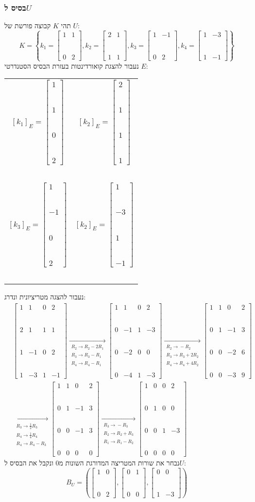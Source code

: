 \documentclass[11pt, oneside]{article}
\newcommand{\qed}{\R{$\blacksquare$}}
\newcommand{\br}{\\\\\\\\\\\\}
\newcommand{\opr}[1]{\xrightarrow[\text{#1}]{}}
\newcommand{\oprm}[1]{\underset{\substack{#1}}{\longrightarrow}}
\newcommand{\tot}[4]{\begin{bmatrix}#1 & #2\br#3 & #4\end{bmatrix}}
\newcommand{\fcol}[4]{\begin{bmatrix}#1 \br #2\br#3 \br #4\end{bmatrix}}
\begin{document}
\subsubsection{בסיס ל$U$}
תהי $K$ קבוצה פורשת של $U$:
$$K = \left\{
k_1 = \tot{1}{1}{0}{2},
k_2 = \tot{2}{1}{1}{1},
k_3 = \tot{1}{-1}{0}{2},
k_4 = \tot{1}{-3}{1}{-1}
\right\}$$
נעבור להצגת קואורדינטות בעזרת הבסיס הסטנדרטי $E$:
\begin{center}
\begin{tabular}{c c}
$[k_1]_E = \fcol{1}{1}{0}{2}$ & $[k_2]_E = \fcol{2}{1}{1}{1}$\br
$[k_3]_E = \fcol{1}{-1}{0}{2}$ & $[k_2]_E = \fcol{1}{-3}{1}{-1}$\br
\end{tabular}
\end{center}
נעבור להצגה מטריציונית ונדרג:
\begin{align*}
& \begin{bmatrix}
1 & 1 & 0 & 2\br
2 & 1 & 1 & 1\br
1 & -1 & 0 & 2\br
1 & -3 & 1 & -1
\end{bmatrix}
\oprm{%
R_2 \opr{} R_2 - 2R_1\\
R_3 \opr{} R_3 - R_1\\
R_4 \opr{} R_4 - R_1
}
\begin{bmatrix}
1 & 1 & 0 & 2\br
0 & -1 & 1 & -3\br
0 & -2 & 0 & 0\br
0 & -4 & 1 & -3
\end{bmatrix}
\oprm{%
R_2 \opr{} -R_2\\
R_3 \opr{} R_3 + 2R_2\\
R_4 \opr{} R_4 + 4R_2
}
\begin{bmatrix}
1 & 1 & 0 & 2\br
0 & 1 & -1 & 3\br
0 & 0 & -2 & 6\br
0 & 0 & -3 & 9
\end{bmatrix}\\
& \oprm{%
R_3 \opr{} \frac{1}{2} R_3\\
R_4 \opr{} \frac{1}{4} R_4\\
R_4 \opr{} R_4 - R_3
}
\begin{bmatrix}
1 & 1 & 0 & 2\br
0 & 1 & -1 & 3\br
0 & 0 & -1 & 3\br
0 & 0 & 0 & 0
\end{bmatrix}
\oprm{%
R_3 \opr{} -R_3\\
R_2 \opr{} R_2 + R_3\\
R_1 \opr{} R_1 - R_2
}
\begin{bmatrix}
1 & 0 & 0 & 2\br
0 & 1 & 0 & 0\br
0 & 0 & 1 & -3\br
0 & 0 & 0 & 0
\end{bmatrix}
\end{align*}
נבחר את שורות המטריצה המדורגת השונות מ$0$ ונקבל את הבסיס ל$U$:
$$B_U = \left(\tot{1}{0}{0}{2},\tot{0}{1}{0}{0},\tot{0}{0}{1}{-3}\right)$$
\qed
\clearpage
\end{document}
